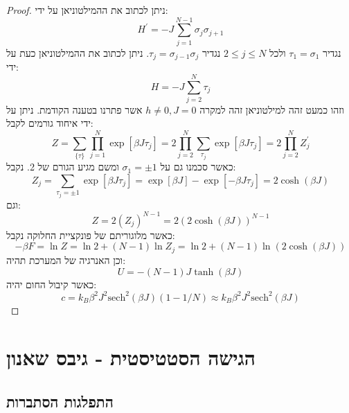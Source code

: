 \documentclass{tstextbook}
\begin{document}
\begin{proposition}[שרשרת איזינג עם \(h=0\)]
\end{proposition}
\begin{proof}
ניתן לכתוב את ההמילטוניאן על ידי:
$$H^{\prime}=-J\sum_{j=1}^{N-1}\sigma_{j}\sigma_{j+1}$$
נגדיר \(\tau_{1}=\sigma_{1}\) ולכל \(2\leq j\leq N\) נגדיר \(\tau_{j}=\sigma_{j-1}\sigma_{j}\). ניתן לכתוב את ההמילטוניאן כעת על ידי:
$$H=-J\sum_{j=2}^{N}\tau_{j}$$
וזהו כמעט זהה למילטוניאן זהה למקרה \(h\neq 0,J=0\) אשר פתרנו בטענה הקודמת. ניתן על ידי איחוד גורמים לקבל:
$$Z=\sum_{\{\tau\}}\prod_{j=1}^{N}\exp[\beta J\tau_{j}]=2\prod_{j=2}^{N}\sum_{\tau_{j}}\exp[\beta J\tau_{j}]=2\prod_{j=2}^{N}Z_{j}^{\prime}$$
כאשר סכמנו גם על \(\sigma_{1}=\pm 1\) ומשם מגיע הגורם של 2. נקבל:
$$Z_{j}=\sum_{\tau_{j}=\pm1}\exp[\beta J\tau_{j}]=\exp[\beta J]-\exp[-\beta J\tau_{j}]=2\cosh(\beta J)$$
וגם:
$$Z=2(Z_{j})^{N-1}=2\left(2\cosh(\beta J)\right)^{N-1}$$
כאשר מלוגוריתם של פונקציית החלוקה נקבל:
$$-\beta F=\ln Z=\ln2+(N-1)\ln Z_{j}=\ln2+(N-1)\ln\left(2\cosh(\beta J)\right)$$
וכן האנרגיה של המערכת תהיה:
$$U=-(N-1)J\operatorname{tanh}(\beta J)$$
כאשר קיבול החום יהיה:
$$c=k_{B}\beta^{2}J^{2}\mathrm{sech}^{2}(\beta J)\left(1-1/N\right)\approx k_{B}\beta^{2}J^{2}\mathrm{sech}^{2}(\beta J)$$

\end{proof}
\chapter{הגישה הסטטיסטית - גיבס שאנון}

\section{התפלגות הסתברות}
\end{document}
